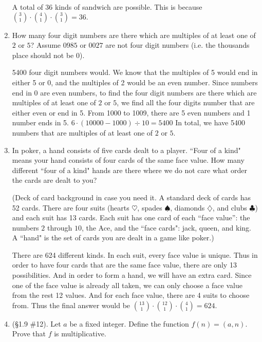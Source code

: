 \documentclass[11pt,a4paper]{article}
\begin{document}
\begin{enumerate}
	A total of 36 kinds of sandwich are possible. This is because ${3 \choose 1} \cdot {4 \choose 1} \cdot {3 \choose 1} = 36.$

	\item How many four digit numbers are there which are multiples of at least one of \(2\) or \(5\)?  Assume \(0985\) or \(0027\) are not four digit numbers (i.e. the thousands place should not be \(0\)).

	5400 four digit numbers would. We know that the multiples of 5 would end in either 5 or 0, and the multiples of 2 would be an even number. Since numbers end in 0 are even numbers, to find the four digit numbers are there which are multiples of at least one of \(2\) or \(5\), we find all the four digits number that are either even or end in 5. From 1000 to 1009, there are 5 even numbers and 1 number ends in 5. $6 \cdot (10000-1000) \div 10 = 5400$ In total, we have 5400 numbers that are multiples of at least one of \(2\) or \(5\).

	\item In poker, a hand consists of five cards dealt to a player.  ``Four of a kind" means your hand consists of four cards of the same face value.  How many different ``four of a kind" hands are there where we do not care what order the cards are dealt to you?

	(Deck of card background in case you need it.  A standard deck of cards has 52 cards.  There are four suits (hearts $\heartsuit$, spades $\spadesuit$, diamonds $\diamondsuit$, and clubs $\clubsuit$) and each suit has 13 cards. Each suit has one card of each ``face value'': the numbers \(2\) through \(10\), the Ace, and the ``face cards":  jack, queen, and king.   A ``hand" is the set of cards you are dealt in a game like poker.)

	There are 624 different kinds. In each suit, every face value is unique. Thus in order to have four cards that are the same face value, there are only 13 possibilities. And in order to form a hand, we will have an extra card. Since one of the face value is already all taken, we can only choose a face value from the rest 12 values. And for each face value, there are 4 suits to choose from. Thus the final answer would be ${13 \choose 1} \cdot {12 \choose 1} \cdot {4 \choose 1} = 624.$

	\item (\S 1.9 \#12).  Let \(a\) be a fixed integer. Define the function \(f(n) = (a,n)\). Prove that \(f\) is multiplicative.


\end{enumerate}
\end{document}
